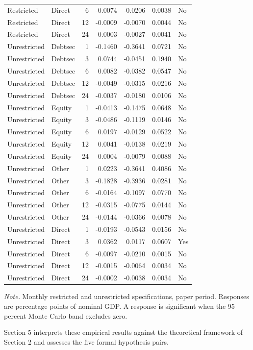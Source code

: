 \begin{longtable}{@{}l l r r r r l@{}}
Restricted & Direct & 6 & -0.0074 & -0.0206 & 0.0038 & No \\
Restricted & Direct & 12 & -0.0009 & -0.0070 & 0.0044 & No \\
Restricted & Direct & 24 & 0.0003 & -0.0027 & 0.0041 & No \\
Unrestricted & Debtsec & 1 & -0.1460 & -0.3641 & 0.0721 & No \\
Unrestricted & Debtsec & 3 & 0.0744 & -0.0451 & 0.1940 & No \\
Unrestricted & Debtsec & 6 & 0.0082 & -0.0382 & 0.0547 & No \\
Unrestricted & Debtsec & 12 & -0.0049 & -0.0315 & 0.0216 & No \\
Unrestricted & Debtsec & 24 & -0.0037 & -0.0180 & 0.0106 & No \\
Unrestricted & Equity & 1 & -0.0413 & -0.1475 & 0.0648 & No \\
Unrestricted & Equity & 3 & -0.0486 & -0.1119 & 0.0146 & No \\
Unrestricted & Equity & 6 & 0.0197 & -0.0129 & 0.0522 & No \\
Unrestricted & Equity & 12 & 0.0041 & -0.0138 & 0.0219 & No \\
Unrestricted & Equity & 24 & 0.0004 & -0.0079 & 0.0088 & No \\
Unrestricted & Other & 1 & 0.0223 & -0.3641 & 0.4086 & No \\
Unrestricted & Other & 3 & -0.1828 & -0.3936 & 0.0281 & No \\
Unrestricted & Other & 6 & -0.0164 & -0.1097 & 0.0770 & No \\
Unrestricted & Other & 12 & -0.0315 & -0.0775 & 0.0144 & No \\
Unrestricted & Other & 24 & -0.0144 & -0.0366 & 0.0078 & No \\
Unrestricted & Direct & 1 & -0.0193 & -0.0543 & 0.0156 & No \\
Unrestricted & Direct & 3 & 0.0362 & 0.0117 & 0.0607 & Yes \\
Unrestricted & Direct & 6 & -0.0097 & -0.0210 & 0.0015 & No \\
Unrestricted & Direct & 12 & -0.0015 & -0.0064 & 0.0034 & No \\
Unrestricted & Direct & 24 & -0.0002 & -0.0038 & 0.0034 & No \\
  \bottomrule
\end{longtable}

\begin{center}
  \small\textit{Note.} Monthly restricted and unrestricted specifications, paper period. Responses are percentage points of nominal GDP. A response is significant when the 95 percent Monte Carlo band excludes zero.
\end{center}

Section 5 interprets these empirical results against the theoretical framework of Section 2 and assesses the five formal hypothesis pairs.

